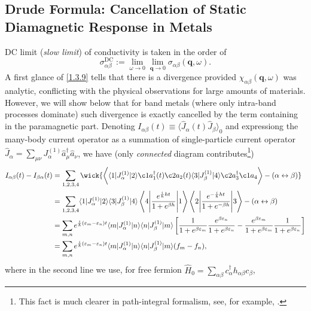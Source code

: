 \documentclass[10pt,nofootinbib,letterpaper]{revtex4}
\begin{document}
	\subsection{Drude Formula: Cancellation of Static Diamagnetic Response in Metals}
		DC limit (\emph{slow limit}) of conductivity is taken in the order of
		\begin{equation}\label{1.4.1}
			\sigma_{\alpha\beta}^{\text{DC}}:=\lim_{\omega \rightarrow0}\lim_{\bm{q}\rightarrow0}\sigma_{\alpha\beta}(\bm{q},\omega).
		\end{equation}
		A first glance of \eqref{1.3.9} tells that there is a divergence provided $\chi_{\alpha\beta}(\bm{q},\omega)$ was analytic, conflicting with the physical observations for large amounts of materials. However, we will show below that for band metals (where only intra-band processes dominate) such divergence is exactly cancelled by the term containing in the paramagnetic part. Denoting $I_{\alpha\beta}(t)\equiv\langle\hat J_\alpha(t)\hat J_\beta\rangle_0$ and expressiong the many-body current operator as a summation of single-particle current operator $\hat J_\alpha=\sum_{\mu\nu}J^{(1)}_\alpha\hat a_\mu^\dagger\hat a_\nu$, we have (only \emph{connected} diagram contributes\footnote{This fact is much clearer in path-integral formalism, see, for example, \cite{fradkin2013field}.})
		\begin{align*}
			I_{\alpha\beta}(t)-I_{\beta\alpha}(t)&=\sum_{1,2,3,4}\wick{\bigg\langle\langle 1|J^{(1)}_\alpha|2\rangle\c1 a_1^\dagger(t) \c2 a_2(t)\langle 3|J^{(1)}_\beta|4\rangle \c2 a_3^\dagger \c1 a_4\bigg\rangle-(\alpha\leftrightarrow\beta)}\\
			&=\sum_{1,2,3,4}\langle 1|J^{(1)}_\alpha|2\rangle\langle 3|J^{(1)}_\beta|4\rangle\left\langle 4\middle|\dfrac{e^{\frac{i}{\hbar}ht}}{1+e^{\beta h}}\middle|1\right\rangle\left\langle2\middle|\dfrac{e^{-\frac{i}{\hbar}ht}}{1+e^{-\beta h}}\middle|3\right\rangle-(\alpha\leftrightarrow\beta)\\
			&=\sum_{m,n}e^{\frac{i}{\hbar}(\varepsilon_m-\varepsilon_n)t}\langle m|J^{(1)}_\alpha|n\rangle\langle n|J^{(1)}_\beta|m\rangle\left[\dfrac{1}{1+e^{\beta \varepsilon_m}}\dfrac{e^{\beta \varepsilon_n}}{1+e^{\beta \varepsilon_n}}-\dfrac{e^{\beta \varepsilon_m}}{1+e^{\beta \varepsilon_m}}\dfrac{1}{1+e^{\beta \varepsilon_n}}\right]\\
			&=\sum_{m,n}e^{\frac i\hbar(\varepsilon_m-\varepsilon_n)t}\langle m|J^{(1)}_\alpha|n\rangle\langle n|J^{(1)}_\beta|m\rangle(f_m-f_n),
		\end{align*}
		where in the second line we use, for free fermion $\hat H_0=\sum_{\alpha\beta}c_\alpha^\dagger h_{\alpha\beta}c_\beta$,
\end{document}
